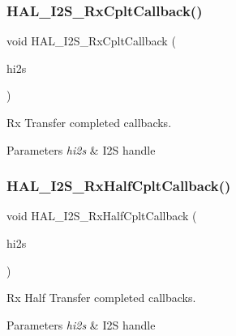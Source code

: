 \subsubsection{\texorpdfstring{H\+A\+L\+\_\+\+I2\+S\+\_\+\+Rx\+Cplt\+Callback()}{HAL\_I2S\_RxCpltCallback()}}
{\footnotesize\ttfamily void H\+A\+L\+\_\+\+I2\+S\+\_\+\+Rx\+Cplt\+Callback (\begin{DoxyParamCaption}\item[{I2\+S\+\_\+\+Handle\+Type\+Def $\ast$}]{hi2s }\end{DoxyParamCaption})}



Rx Transfer completed callbacks. 


\begin{DoxyParams}{Parameters}
{\em hi2s} & I2S handle \\
\hline
\end{DoxyParams}
\mbox{\label{group___s_t_m32_f4___d_i_s_c_o_v_e_r_y___a_u_d_i_o___i_n___private___functions_ga6c4cd3b18c42c6de0c3f4fe7068a5b12}} 
\subsubsection{\texorpdfstring{H\+A\+L\+\_\+\+I2\+S\+\_\+\+Rx\+Half\+Cplt\+Callback()}{HAL\_I2S\_RxHalfCpltCallback()}}
{\footnotesize\ttfamily void H\+A\+L\+\_\+\+I2\+S\+\_\+\+Rx\+Half\+Cplt\+Callback (\begin{DoxyParamCaption}\item[{I2\+S\+\_\+\+Handle\+Type\+Def $\ast$}]{hi2s }\end{DoxyParamCaption})}



Rx Half Transfer completed callbacks. 


\begin{DoxyParams}{Parameters}
{\em hi2s} & I2S handle \\
\hline
\end{DoxyParams}
